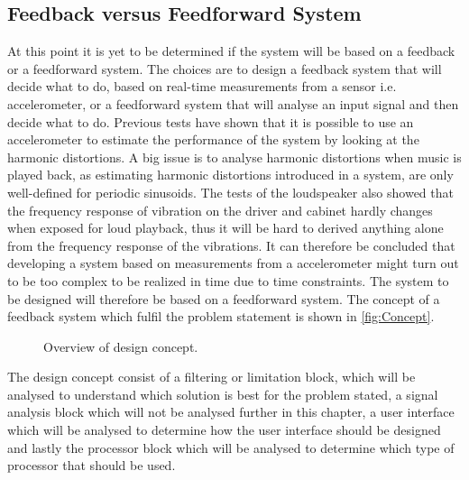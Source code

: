 \subsection{Feedback versus Feedforward System}

At this point it is yet to be determined if the system will be based on a feedback or a feedforward system. The choices are to design a feedback system that will decide what to do, based on real-time measurements from a sensor i.e. accelerometer, or a feedforward system that will analyse an input signal and then decide what to do. Previous tests have shown that it is possible to use an accelerometer to estimate the performance of the system by looking at the harmonic distortions. A big issue is to analyse harmonic distortions when music is played back, as estimating harmonic distortions introduced in a system, are only well-defined for periodic sinusoids. The tests of the loudspeaker also showed that the frequency response of vibration on the driver and cabinet hardly changes when exposed for loud playback, thus it will be hard to derived anything alone from the frequency response of the vibrations. It can therefore be concluded that developing a system based on measurements from a accelerometer might turn out to be too complex to be realized in time due to time constraints. The system to be designed will therefore be based on a feedforward system. The concept of a feedback system which fulfil the problem statement is shown in \autoref{fig:Concept}.

\begin{figure}[H]
\centering
{}
\scalebox{0.8}{
}
\caption{Overview of design concept.}
\label{fig:Concept}
\end{figure}

The design concept consist of a filtering or limitation block, which will be analysed to understand which solution is best for the problem stated, a signal analysis block which will not be analysed further in this chapter, a user interface which will be analysed to determine how the user interface should be designed and lastly the processor block which will be analysed to determine which type of processor that should be used. 










